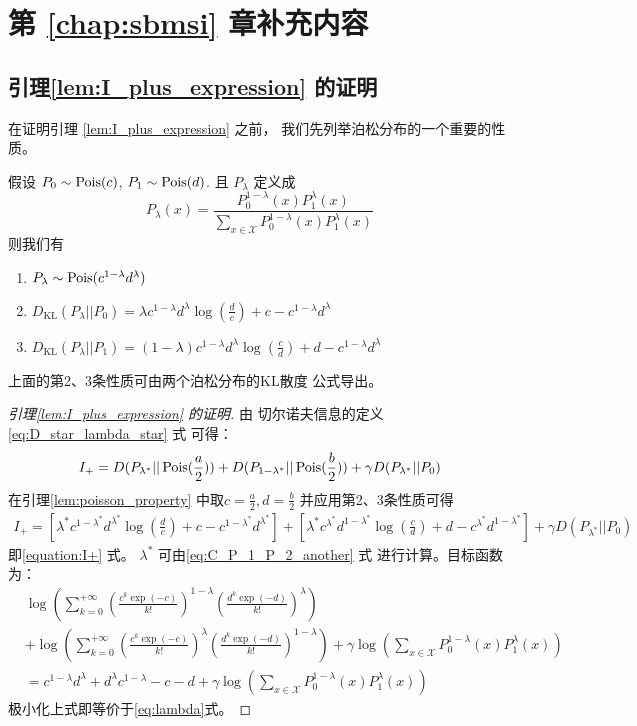 \chapter{第 \ref{chap:sbmsi} 章补充内容}
\section{引理\ref{lem:I_plus_expression} 的证明}
在证明引理
\ref{lem:I_plus_expression}  之前，
我们先列举泊松分布的一个重要的性质。
\begin{lemma}\label{lem:poisson_property}
假设 $P_0 \sim \operatorname{Pois}(c)$, $P_1 \sim \operatorname{Pois}(d)$.
且 $P_{\lambda}$ 定义成
$$
P_{\lambda}(x) = \frac{P_0^{1-\lambda}(x) P_1^{\lambda} (x)}
{\sum_{x \in \mathcal{X}}P_0^{1-\lambda}(x) P_1^{\lambda} (x)}
$$
则我们有
\begin{enumerate}
    \item $P_{\lambda} \sim \operatorname{Pois}(c^{1-\lambda} d^{\lambda})$
    \item $D_{\mathrm{KL}}(P_{\lambda}||P_0) = 
    \lambda c^{1-\lambda}d^{\lambda}\log(\frac{d}{c}) + c-c^{1-\lambda}d^{\lambda}$
    \item $D_{\mathrm{KL}}(P_{\lambda}||P_1) = (1-\lambda)
    c^{1-\lambda}d^{\lambda}\log(\frac{c}{d})
    + d-c^{1-\lambda}d^{\lambda}$
\end{enumerate}
\end{lemma}
上面的第2、3条性质可由两个泊松分布的KL散度
公式导出。
\begin{proof}[引理\ref{lem:I_plus_expression} 的证明]
由 切尔诺夫信息的定义 \eqref{eq:D_star_lambda_star} 式
可得：
$$
I_+ = D(P_{\lambda^*} || \operatorname{Pois}(\frac{a}{2}))
+ D(P_{1-\lambda^*} || \operatorname{Pois}(\frac{b}{2}))
+ \gamma D(P_{\lambda^*} || P_0)
$$
在引理\ref{lem:poisson_property}
中取$c=\frac{a}{2}, d=\frac{b}{2}$
并应用第2、3条性质可得
\begin{align*}
    I_+ = \left[\lambda^* c^{1-\lambda^*}d^{\lambda^*}
    \log(\frac{d}{c})+ c-c^{1-\lambda^*}d^{\lambda^*}
    \right]
+ \left[\lambda^* c^{\lambda^*}d^{1-\lambda^*}\log(\frac{c}{d})
+ d - c^{\lambda^*}d^{1-\lambda^*}\right]
+ \gamma D(P_{\lambda^*} || P_0)
\end{align*}
即\eqref{equation:I+} 式。
$\lambda^*$ 可由\eqref{eq:C_P_1_P_2_another} 式
进行计算。目标函数为：
\begin{align*}
&\log\left(\sum_{k=0}^{+\infty} \left(\frac{c^k\exp(-c)}{k!}
\right)^{1-\lambda}
\left(\frac{d^k\exp(-d)}{k!} \right)^{\lambda}
\right) \\
& + \log\left(\sum_{k=0}^{+\infty} \left(\frac{c^k\exp(-c)}{k!}
\right)^{\lambda}
\left(\frac{d^k\exp(-d)}{k!} \right)^{1-\lambda}
\right)+
\gamma\log(\sum_{x\in \mathcal{X}}P^{1-\lambda}_0(x) P^{\lambda}_1(x)
)\\
& = c^{1-\lambda} d^{\lambda} 
+ d^{\lambda} c^{1-\lambda} -c -d +
\gamma\log(\sum_{x\in \mathcal{X}}P^{1-\lambda}_0(x) P^{\lambda}_1(x)
)
\end{align*}
极小化上式即等价于\eqref{eq:lambda}式。
\end{proof}

